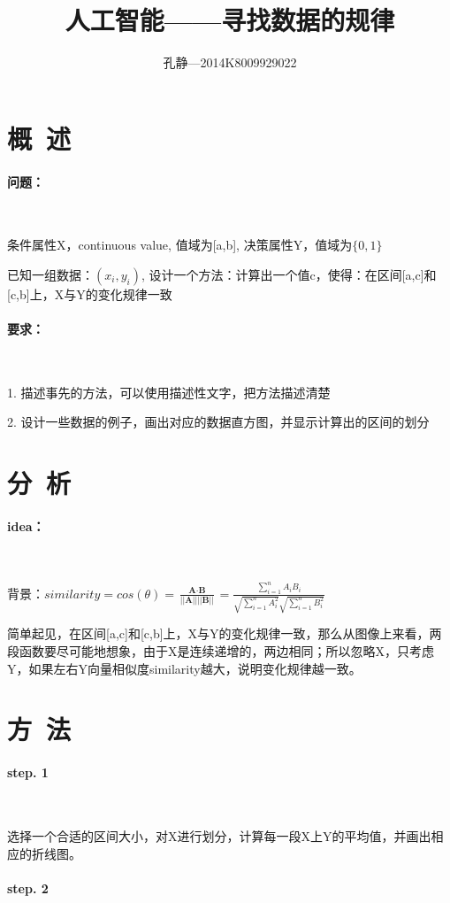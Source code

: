 \documentclass{article}
\author{孔静—2014K8009929022}
\title{人工智能——寻找数据的规律}
\begin{document}
   
	\maketitle
	\tableofcontents
	\section{概\ 述}
		\paragraph{问题：}\ 
		 
		条件属性X，continuous value, 值域为[a,b], 决策属性Y，值域为$\{0,1\}$

		已知一组数据：${(x_i,y_i)}$, 设计一个方法：计算出一个值c，使得：在区间[a,c]和[c,b]上，X与Y的变化规律一致
		\paragraph{要求：}\

		1. 描述事先的方法，可以使用描述性文字，把方法描述清楚
		
		2. 设计一些数据的例子，画出对应的数据直方图，并显示计算出的区间的划分
	\section{分\ 析}
		\paragraph{idea：}\
		
		背景：$similarity=cos(\theta)=\frac{\textbf{A}\cdot\textbf{B}}{||\textbf{A}||||\textbf{B}||}=\frac{\sum_{i=1}^{n} A_{i} B_{i}}{\sqrt{\sum_{i=1}^{n} A_{i}^{2}}\sqrt{\sum_{i=1}^{n}B_{i}^{2}}}$
		
		简单起见，在区间[a,c]和[c,b]上，X与Y的变化规律一致，那么从图像上来看，两段函数要尽可能地想象，由于X是连续递增的，两边相同；所以忽略X，只考虑Y，如果左右Y向量相似度similarity越大，说明变化规律越一致。
	\section{方\ 法}
		\paragraph{step. 1}\
		
		选择一个合适的区间大小，对X进行划分，计算每一段X上Y的平均值，并画出相应的折线图。
		
		\paragraph{step. 2}\
		
\end{document}
